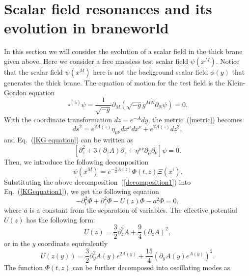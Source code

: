 \section{Scalar field resonances and its evolution in braneworld}
\label{Scalar field resonances}
In this section we will consider the evolution of a scalar field in the thick brane given above.  Here we consider a free massless test scalar field $\psi(x^{M})$. Notice that the scalar field $\psi(x^{M})$ here is not the background scalar field $\phi(y)$ that generates the thick brane. The equation of motion for the test field is the Klein-Gordon equation
\begin{equation}
\square^{(5)} \psi=\frac{1}{\sqrt{-g}}\partial_{M}(\sqrt{-g}g^{MN}\partial_{N}\psi)=0.\label{KG equation}
\end{equation}
With the coordinate transformation $dz=e^{-A}dy$, the metric~(\ref{metric}) becomes
\begin{equation}
   ds^2=e^{2A(z)}\eta_{\mu\nu}dx^\mu dx^\nu+e^{2A(z)}dz^2,
   \label{conformalmetric}
\end{equation}
and Eq.~(\ref{KG equation}) can be written as
\begin{equation}
\left[\partial^{2}_{z}+3(\partial_{z}A)\partial_{z}+\eta^{\mu\nu}\partial_{\mu}\partial_{\nu}\right]\psi=0.\label{KGequation1}
\end{equation}
Then, we introduce the following decomposition
\begin{equation}
\psi(x^{M})=e^{-\frac{3}{2}A(z)}\Phi(t,z)\Xi(x^{i}).\label{decomposition1}
\end{equation}
Substituting the above decomposition~(\ref{decomposition1}) into Eq.~(\ref{KGequation1}), we get the following equation
\begin{equation}
-\partial_{t}^{2}\Phi+\partial_{z}^{2}\Phi-U(z)\Phi-a^{2}\Phi=0,\label{evolutionequation}
\end{equation}
where $a$ is a constant from the separation of variables. The effective potential $U(z)$ has the following form:
\begin{equation}
U(z)=\frac{3}{2}\partial_{z}^{2}A+\frac{9}{4}(\partial_{z}A)^{2},\label{effectivepotential}
\end{equation}
or in the $y$ coordinate equivalently
\begin{equation}
U(z(y))=\frac{3}{2}\partial_{y}^{2}A(y)e^{2A(y)}+\frac{15}{4}\left(\partial_{y}A(y)e^{A(y)}\right)^{2}.\label{effectivepotentialy}
\end{equation}
The function $\Phi(t,z)$ can be further decomposed into oscillating modes as
